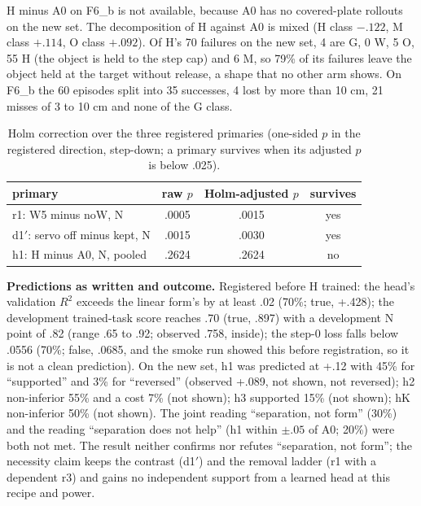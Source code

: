 H minus A0 on F6\_b is not available, because A0 has no covered-plate rollouts on the new set. The decomposition of H against A0 is mixed (H class $-.122$, M class $+.114$, O class $+.092$). Of H's 70 failures on the new set, 4 are G, 0 W, 5 O, 55 H (the object is held to the step cap) and 6 M, so 79\% of its failures leave the object held at the target without release, a shape that no other arm shows. On F6\_b the 60 episodes split into 35 successes, 4 lost by more than 10 cm, 21 misses of 3 to 10 cm and none of the G class.

\begin{table}[h]
\caption{Holm correction over the three registered primaries (one-sided $p$ in the registered direction, step-down; a primary survives when its adjusted $p$ is below .025).}
\label{tab:M5}
\centering
\footnotesize
\begin{tabular}{@{}lccc@{}}
\toprule
primary & raw $p$ & Holm-adjusted $p$ & survives \\
\midrule
r1: W5 minus noW, N & .0005 & .0015 & yes \\
d1$'$: \pizero{} servo off minus kept, N & .0015 & .0030 & yes \\
h1: H minus A0, N, pooled & .2624 & .2624 & no \\
\bottomrule
\end{tabular}
\end{table}

\textbf{Predictions as written and outcome.} Registered before H trained: the head's validation $R^2$ exceeds the linear form's by at least .02 (70\%; true, +.428); the development trained-task score reaches .70 (true, .897) with a development N point of .82 (range .65 to .92; observed .758, inside); the step-0 loss falls below .0556 (70\%; false, .0685, and the smoke run showed this before registration, so it is not a clean prediction). On the new set, h1 was predicted at +.12 with 45\% for ``supported'' and 3\% for ``reversed'' (observed +.089, not shown, not reversed); h2 non-inferior 55\% and a cost 7\% (not shown); h3 supported 15\% (not shown); hK non-inferior 50\% (not shown). The joint reading ``separation, not form'' (30\%) and the reading ``separation does not help'' (h1 within $\pm.05$ of A0; 20\%) were both not met. The result neither confirms nor refutes ``separation, not form''; the necessity claim keeps the \pizero{} contrast (d1$'$) and the removal ladder (r1 with a dependent r3) and gains no independent support from a learned head at this recipe and power.

